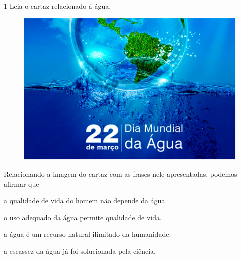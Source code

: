\begin{conteudo}
\begin{conteudo}
\begin{conteudo}
\begin{conteudo}
\num{1} Leia o cartaz relacionado à água.
\begin{figure}[htpb!]
\includegraphics[width=\textwidth]{media/image17.png}
\end{figure}




Relacionando a imagem do cartaz com as frases nele apresentadas, podemos
afirmar que 

\begin{escolha}
\item a qualidade de vida do homem não depende da água.

\item o uso adequado da água permite qualidade de vida.

\item a água é um recurso natural ilimitado da humanidade.

\item a escassez da água já foi solucionada pela ciência.
\end{escolha}


\end{conteudo}
\end{conteudo}
\end{conteudo}
\end{conteudo}
